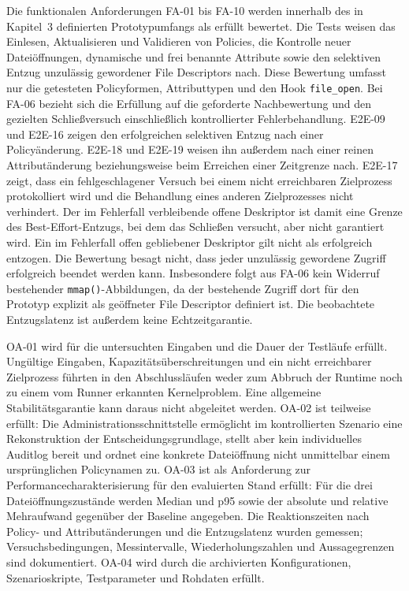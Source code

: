Die funktionalen Anforderungen FA-01 bis FA-10 werden innerhalb des in Kapitel~3 definierten
Prototypumfangs als erfüllt bewertet. Die Tests weisen das Einlesen, Aktualisieren und Validieren
von Policies, die Kontrolle neuer Dateiöffnungen, dynamische und frei benannte Attribute sowie
den selektiven Entzug unzulässig gewordener File Descriptors nach. Diese Bewertung umfasst nur
die getesteten Policyformen, Attributtypen und den Hook \texttt{file\_open}.
Bei FA-06 bezieht sich die Erfüllung auf die geforderte Nachbewertung und den gezielten
Schließversuch einschließlich kontrollierter Fehlerbehandlung. E2E-09 und E2E-16 zeigen den
erfolgreichen selektiven Entzug nach einer Policyänderung. E2E-18 und E2E-19 weisen ihn außerdem
nach einer reinen Attributänderung beziehungsweise beim Erreichen einer Zeitgrenze nach.
E2E-17 zeigt, dass ein fehlgeschlagener
Versuch bei einem nicht erreichbaren Zielprozess protokolliert wird und die Behandlung eines
anderen Zielprozesses nicht verhindert. Der im Fehlerfall verbleibende offene Deskriptor ist
damit eine Grenze des Best-Effort-Entzugs, bei dem das Schließen versucht, aber nicht garantiert
wird. Ein im Fehlerfall offen gebliebener Deskriptor gilt nicht als erfolgreich entzogen. Die Bewertung besagt nicht,
dass jeder unzulässig gewordene Zugriff erfolgreich beendet werden kann. Insbesondere folgt
aus FA-06 kein Widerruf bestehender \texttt{mmap()}-Abbildungen, da der bestehende Zugriff dort für
den Prototyp explizit als geöffneter File Descriptor definiert ist. Die beobachtete
Entzugslatenz ist außerdem keine Echtzeitgarantie.

OA-01 wird für die untersuchten Eingaben und die Dauer der Testläufe erfüllt. Ungültige Eingaben,
Kapazitätsüberschreitungen und ein nicht erreichbarer Zielprozess führten in den Abschlussläufen
weder zum Abbruch der Runtime noch zu einem vom Runner erkannten Kernelproblem. Eine allgemeine
Stabilitätsgarantie kann daraus nicht abgeleitet werden. OA-02 ist teilweise erfüllt: Die
Administrationsschnittstelle ermöglicht im kontrollierten Szenario eine Rekonstruktion der
Entscheidungsgrundlage, stellt aber kein individuelles Auditlog bereit und ordnet eine konkrete
Dateiöffnung nicht unmittelbar einem ursprünglichen Policynamen zu. OA-03 ist als Anforderung
zur Performancecharakterisierung für den evaluierten Stand erfüllt: Für die drei Dateiöffnungszustände werden Median
und p95 sowie der absolute und relative Mehraufwand gegenüber der Baseline angegeben.
Die Reaktionszeiten nach Policy- und Attributänderungen und die Entzugslatenz wurden gemessen;
Versuchsbedingungen, Messintervalle, Wiederholungszahlen und Aussagegrenzen sind dokumentiert.
OA-04 wird durch die archivierten Konfigurationen,
Szenarioskripte, Testparameter und Rohdaten erfüllt.


